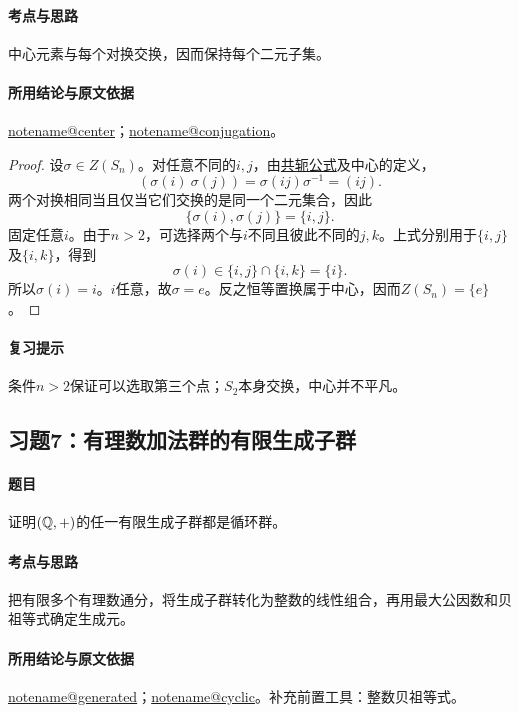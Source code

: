 \documentclass[UTF8,a4paper,11pt,fontset=windows]{ctexart}
\makeatletter
\newcommand{\noteref}[1]{\hyperref[note:#1]{\csname notename@#1\endcsname}}
\newcommand{\proofref}[2]{\hyperref[note:#1]{#2}}
\newcommand{\exref}[2]{\hyperref[ex:#1:#2]{第#1章习题#2}}
\makeatother
\begin{document}
\paragraph{考点与思路}
中心元素与每个对换交换，因而保持每个二元子集。

\paragraph{所用结论与原文依据}
\noteref{center}；\noteref{conjugation}。


\begin{proof}
设$\sigma\in Z(S_n)$。对任意不同的$i,j$，由\proofref{conjugation}{共轭公式}及中心的定义，
\[
(\sigma(i)\ \sigma(j))=\sigma(ij)\sigma^{-1}=(ij).
\]
两个对换相同当且仅当它们交换的是同一个二元集合，因此
\[
\{\sigma(i),\sigma(j)\}=\{i,j\}.
\]
固定任意$i$。由于$n>2$，可选择两个与$i$不同且彼此不同的$j,k$。上式分别用于$\{i,j\}$及$\{i,k\}$，得到
\[
\sigma(i)\in\{i,j\}\cap\{i,k\}=\{i\}.
\]
所以$\sigma(i)=i$。$i$任意，故$\sigma=e$。反之恒等置换属于中心，因而$Z(S_n)=\{e\}$。
\end{proof}

\paragraph{复习提示}
条件$n>2$保证可以选取第三个点；$S_2$本身交换，中心并不平凡。


\subsection{习题7：\texorpdfstring{有理数加法群的有限生成子群}{有理数加法群的有限生成子群}}
\label{ex:2:7}

\paragraph{题目}
证明$(\mathbb Q,+)$的任一有限生成子群都是循环群。

\paragraph{考点与思路}
把有限多个有理数通分，将生成子群转化为整数的线性组合，再用最大公因数和贝祖等式确定生成元。

\paragraph{所用结论与原文依据}
\noteref{generated}；\noteref{cyclic}。补充前置工具：整数贝祖等式。
\end{document}
